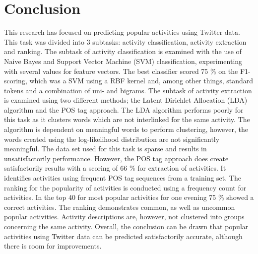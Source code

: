 \section{Conclusion}\label{sec:con}
This research has focused on predicting popular activities using Twitter data. This task was divided into 3 subtasks: activity classification, activity extraction and ranking. The subtask of activity classification is examined with the use of Naive Bayes and Support Vector Machine (SVM) classification, experimenting with several values for feature vectors. The best classifier scored 75 \% on the F1-scoring, which was a SVM using a RBF kernel and, among other things, standard tokens and a combination of uni- and bigrams.
The subtask of activity extraction is examined using two different methods; the Latent Dirichlet Allocation (LDA) algorithm and the POS tag approach. The LDA algorithm performs poorly for this task as it clusters words which are not interlinked for the same activity. The algorithm is dependent on meaningful words to perform clustering, however, the words created using the log-likelihood distribution are not significantly meaningful. The data set used for this task is sparse and results in unsatisfactorily performance.
However, the POS tag approach does create satisfactorily results with a scoring of 66 \% for extraction of activities. It identifies activities using frequent POS tag sequences from a training set. 
The ranking for the popularity of activities is conducted using a frequency count for activities. In the top 40 for most popular activities for one evening 75 \% showed a correct activities. The ranking demonstrates common, as well as uncommon popular activities. Activity descriptions are, however, not clustered into groups concerning the same activity.
Overall, the conclusion can be drawn that popular activities using Twitter data can be predicted satisfactorily accurate, although there is room for improvements. 
